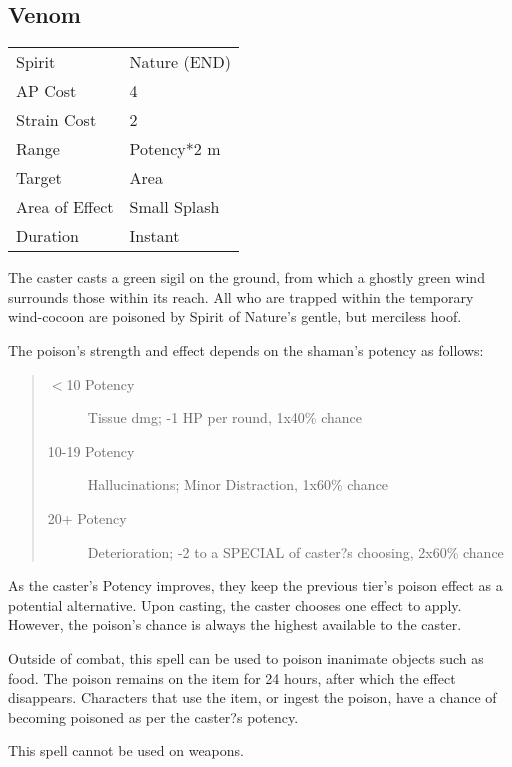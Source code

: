 \documentclass[11pt,a4paper,twocolumn]{book}
\begin{document}
\subsection*{Venom}
{
	\begin{tabu} to 70mm{| X[l,4] | X[l,7] |}
		\hline
		Spirit         & Nature (END) \\
		AP Cost        & 4            \\
		Strain Cost    & 2            \\
		Range          & Potency*2 m  \\
		Target         & Area         \\
		Area of Effect & Small Splash \\
		Duration       & Instant      \\ \hline
	\end{tabu}
}

The caster casts a green sigil on the ground, from which a ghostly green wind surrounds those within its reach. All who are trapped within the temporary wind-cocoon are poisoned by Spirit of Nature's gentle, but merciless hoof.

\newpage
The poison's strength and effect depends on the shaman's potency as follows:
\begin{quote}
	\begin{description}
		\item[$<$10 Potency] 	Tissue dmg; -1 HP per round, 1x40\% chance
		\item[10-19 Potency] 	Hallucinations; Minor Distraction, 1x60\% chance
		\item[20+ Potency] 		Deterioration; -2 to a SPECIAL of caster?s choosing, 2x60\% chance
	\end{description}	
\end{quote}

As the caster's Potency improves, they keep the previous tier's poison effect as a potential alternative. Upon casting, the caster chooses one effect to apply. However, the poison's chance is always the highest available to the caster.

Outside of combat, this spell can be used to poison inanimate objects such as food. The poison remains on the item for 24 hours, after which the effect disappears. Characters that use the item, or ingest the poison, have a chance of becoming poisoned as per the caster?s potency.

This spell cannot be used on weapons.
\end{document}
